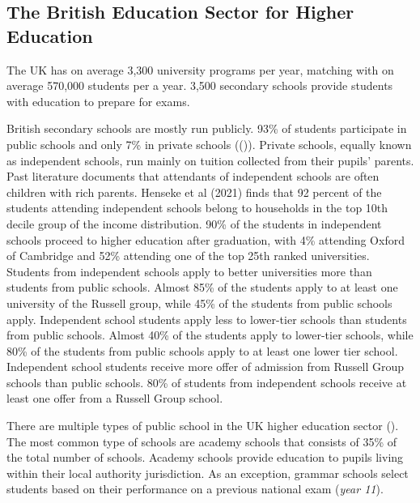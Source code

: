 \subsection{The British Education Sector for Higher Education}
The UK has on average 3,300 university programs per year, matching with on average 570,000 students per a year. 3,500 secondary schools provide students with education to prepare for exams.

British secondary schools are mostly run publicly. 93\% of students participate in public schools and only 7\% in private schools (()). Private schools, equally known as independent schools, run mainly on tuition collected from their pupils' parents. Past literature documents that attendants of independent schools are often children with rich parents. Henseke et al (2021) finds that 92 percent of the students attending independent schools belong to households in the top 10th decile group of the income distribution. 90\% of the students in independent schools proceed to higher education after graduation, with 4\% attending Oxford of Cambridge and 52\% attending one of the top 25th ranked universities. Students from independent schools apply to better universities more than students from public schools. Almost 85\% of the students apply to at least one university of the Russell group, while 45\% of the students from public schools apply. Independent school students apply less to lower-tier schools than students from public schools. Almost 40\% of the students apply to lower-tier schools, while 80\% of the students from public schools apply to at least one lower tier school. Independent school students receive more offer of admission from Russell Group schools than public schools. 80\% of students from independent schools receive at least one offer from a Russell Group school. 

There are multiple types of public school in the UK higher education sector (). The most common type of schools are academy schools that consists of 35\% of the total number of schools. Academy schools provide education to pupils living within their local authority jurisdiction. As an exception, grammar schools select students based on their performance on a previous national exam (\emph{year 11}). 



